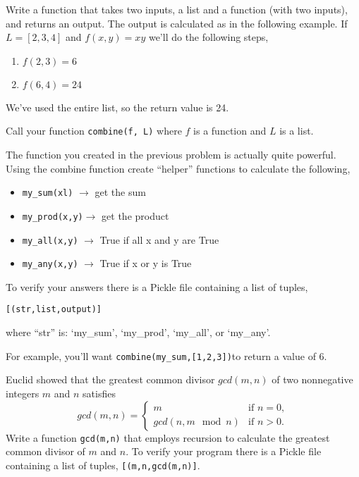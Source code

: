 \documentclass[11pt,letterpaper]{article}
\begin{document}
\begin{problem}
Write a function that takes two inputs, a list and a function (with two inputs), and returns an output. 
The output is calculated as in the following example. If $L=[2,3,4]$ and $f(x,y) = x y$ we'll do the 
following steps,
\begin{enumerate}
 \item $f(2,3) = 6$
 \item $f(6,4) = 24$
\end{enumerate}
We've used the entire list, so the return value is 24.

Call your function \texttt{combine(f, L)} where $f$ is a function and $L$ is a list.


\end{problem}


\begin{problem}
The function you created in the previous problem is actually quite powerful. Using the combine function
create ``helper'' functions to calculate the following,
\begin{itemize}
 \item \texttt{my\_sum(xl)} $\rightarrow$ get the sum
 \item \texttt{my\_prod(x,y)}$\rightarrow$ get the product
 \item \texttt{my\_all(x,y)} $\rightarrow$ True if all x and y are True
 \item \texttt{my\_any(x,y)} $\rightarrow$ True if x or y is True
\end{itemize}
To verify your answers there is a Pickle file containing a list of tuples,
\begin{verbatim}
[(str,list,output)]
\end{verbatim}
where ``str'' is: `my\_sum', `my\_prod', `my\_all', or `my\_any'.

For example, you'll want \texttt{combine(my\_sum,[1,2,3])}to return a value of 6.
\end{problem}



\begin{problem}
 Euclid showed that the greatest common divisor $gcd(m,n)$ of two nonnegative integers $m$ and $n$
satisfies
\[
gcd(m,n) = \left\{
\begin{array}{ll}
m & \text{if }n=0, \\
gcd(n, m\mod n) & \text{if }n>0.
\end{array}
\right.
\]
Write a function \texttt{gcd(m,n)} that employs recursion to calculate the greatest common divisor
of $m$ and $n$. To verify your program there is a Pickle file containing a list of tuples,
\texttt{[(m,n,gcd(m,n)]}.


\end{problem}
\end{document}
